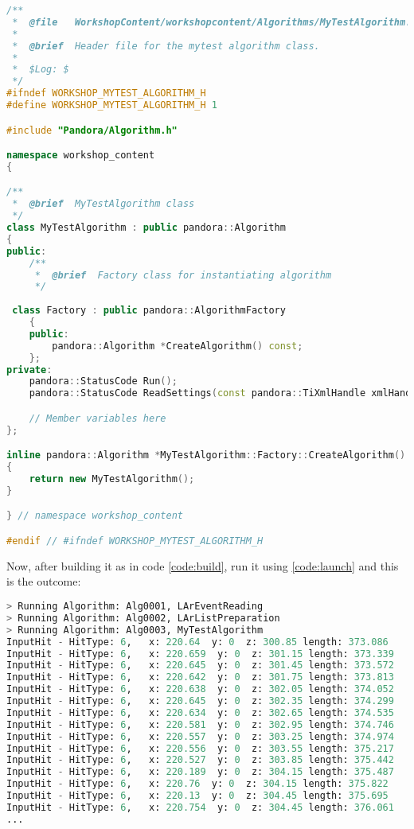 \begin{lstlisting}[language=C++, caption=Version of MyTestAlgorithms.h to sort hits regarding z-coordinate]
/**
 *  @file   WorkshopContent/workshopcontent/Algorithms/MyTestAlgorithm.h
 * 
 *  @brief  Header file for the mytest algorithm class.
 * 
 *  $Log: $
 */
#ifndef WORKSHOP_MYTEST_ALGORITHM_H
#define WORKSHOP_MYTEST_ALGORITHM_H 1

#include "Pandora/Algorithm.h"

namespace workshop_content
{

/**
 *  @brief  MyTestAlgorithm class
 */
class MyTestAlgorithm : public pandora::Algorithm
{
public:
    /**
     *  @brief  Factory class for instantiating algorithm
     */
  
 class Factory : public pandora::AlgorithmFactory
    {
    public:
        pandora::Algorithm *CreateAlgorithm() const;
    };
private:
    pandora::StatusCode Run();
    pandora::StatusCode ReadSettings(const pandora::TiXmlHandle xmlHandle);

    // Member variables here
};

inline pandora::Algorithm *MyTestAlgorithm::Factory::CreateAlgorithm() const
{
    return new MyTestAlgorithm();
}

} // namespace workshop_content

#endif // #ifndef WORKSHOP_MYTEST_ALGORITHM_H
\end{lstlisting}

Now, after building it as in code \ref{code:build}, run it using \ref{code:launch} and this is the outcome:

\begin{lstlisting}[language=Basic, caption=Python example]
> Running Algorithm: Alg0001, LArEventReading
> Running Algorithm: Alg0002, LArListPreparation
> Running Algorithm: Alg0003, MyTestAlgorithm
InputHit - HitType: 6,   x: 220.64  y: 0  z: 300.85 length: 373.086
InputHit - HitType: 6,   x: 220.659  y: 0  z: 301.15 length: 373.339
InputHit - HitType: 6,   x: 220.645  y: 0  z: 301.45 length: 373.572
InputHit - HitType: 6,   x: 220.642  y: 0  z: 301.75 length: 373.813
InputHit - HitType: 6,   x: 220.638  y: 0  z: 302.05 length: 374.052
InputHit - HitType: 6,   x: 220.645  y: 0  z: 302.35 length: 374.299
InputHit - HitType: 6,   x: 220.634  y: 0  z: 302.65 length: 374.535
InputHit - HitType: 6,   x: 220.581  y: 0  z: 302.95 length: 374.746
InputHit - HitType: 6,   x: 220.557  y: 0  z: 303.25 length: 374.974
InputHit - HitType: 6,   x: 220.556  y: 0  z: 303.55 length: 375.217
InputHit - HitType: 6,   x: 220.527  y: 0  z: 303.85 length: 375.442
InputHit - HitType: 6,   x: 220.189  y: 0  z: 304.15 length: 375.487
InputHit - HitType: 6,   x: 220.76  y: 0  z: 304.15 length: 375.822
InputHit - HitType: 6,   x: 220.13  y: 0  z: 304.45 length: 375.695
InputHit - HitType: 6,   x: 220.754  y: 0  z: 304.45 length: 376.061
...
\end{lstlisting}

